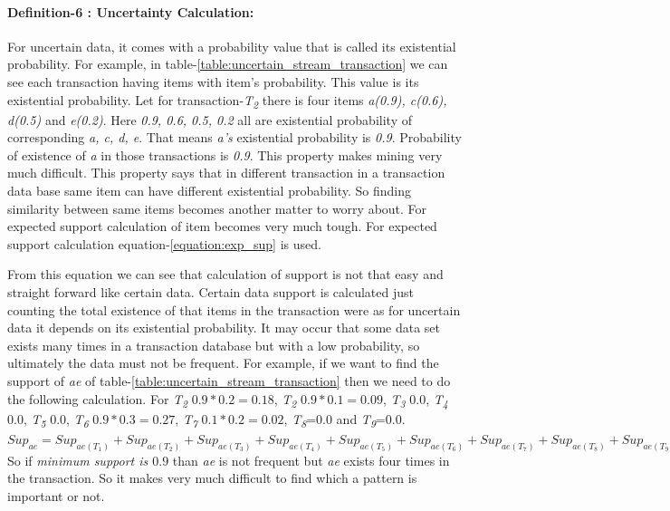 \documentclass[conference]{IEEEtran}
\begin{document}
  
  
  
  
  
  
  
  
  \paragraph{Definition-6 : Uncertainty Calculation: } For uncertain data, it comes with a probability value that is called its existential probability. For example, in table-\ref{table:uncertain_stream_transaction}  we can see each transaction having items with item's probability. This value is its existential probability. Let for transaction-\emph{T\textsubscript{2}} there is four items \emph{a(0.9), c(0.6), d(0.5)} and \emph{e(0.2)}. Here \emph{0.9, 0.6, 0.5, 0.2} all are existential probability of corresponding \emph{a, c, d, e}. That means \emph{a's} existential probability is \emph{0.9}. Probability of existence of \emph{a} in those transactions is \emph{0.9}. This property makes mining very much difficult. This property says that in different transaction in a transaction data base same item can have different existential probability. So finding similarity between same items becomes another matter to worry about. For expected support calculation of item becomes very much tough. For expected support calculation equation-\ref{equation:exp_sup} is used.
    
    From this equation we can see that calculation of support is not that easy and straight forward like certain data. Certain data support is calculated just counting the total existence of that items in the transaction were as for uncertain data it depends on its existential probability. It may occur that some data set exists many times in a transaction database but with a low probability, so ultimately the data must not be frequent. For example, if we want to find the support of \emph{ae} of table-\ref{table:uncertain_stream_transaction} then we need to do the following calculation. For \emph{T\textsubscript{2}} $0.9*0.2=0.18$, \emph{T\textsubscript{2}} $0.9*0.1=0.09$, \emph{T\textsubscript{3}} $0.0$, \emph{T\textsubscript{4}} $0.0$, \emph{T\textsubscript{5}} $0.0$, \emph{T\textsubscript{6}} $0.9*0.3=0.27$, \emph{T\textsubscript{7}} $0.1*0.2=0.02$, \emph{T\textsubscript{8}}=$0.0$ and \emph{T\textsubscript{9}}=$0.0$.$Sup_{ae} =Sup_{ae(T_1)}+Sup_{ae(T_2)}+Sup_{ae(T_3)}+Sup_{ae(T_4)}+Sup_{ae(T_5)}+Sup_{ae(T_6)}+Sup_{ae(T_7)}+Sup_{ae(T_8)}+Sup_{ae(T_9)}=0.18+0.09+0.0+0.0+0.0+0.27+0.0+0.02+0.0+0.0=0.54$ So if \emph{minimum support is $0.9$} than \emph{ae} is not frequent but \emph{ae} exists four times in the transaction. So it makes very much difficult to find which a pattern is important or not.
\end{document}
